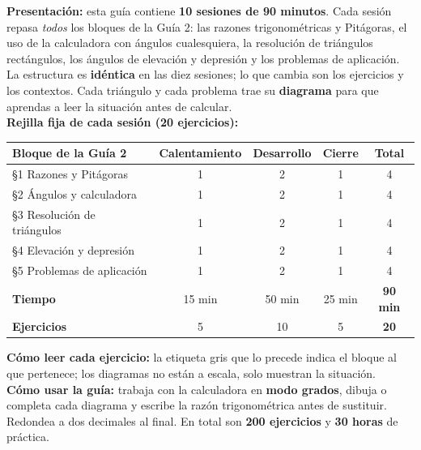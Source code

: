 \documentclass[12pt, letterpaper]{article}
\begin{document}


\vspace{4pt}
\begin{cuadroinfo}
  \small
  \textbf{Presentación:} esta guía contiene \textbf{10 sesiones de 90 minutos}. Cada sesión repasa \emph{todos} los bloques de la Guía 2: las razones trigonométricas y Pitágoras, el uso de la calculadora con ángulos cualesquiera, la resolución de triángulos rectángulos, los ángulos de elevación y depresión y los problemas de aplicación. La estructura es \textbf{idéntica} en las diez sesiones; lo que cambia son los ejercicios y los contextos. Cada triángulo y cada problema trae su \textbf{diagrama} para que aprendas a leer la situación antes de calcular.
  \\[4pt]
  \textbf{Rejilla fija de cada sesión (20 ejercicios):}
  \begin{center}
    \small
    \begin{tabular}{@{}l ccc c@{}}
      \toprule
      \textbf{Bloque de la Guía 2} & \textbf{Calentamiento} & \textbf{Desarrollo} & \textbf{Cierre} & \textbf{Total} \\
      \midrule
      §1 Razones y Pitágoras              & 1 & 2 & 1 & 4 \\
      §2 Ángulos y calculadora            & 1 & 2 & 1 & 4 \\
      §3 Resolución de triángulos         & 1 & 2 & 1 & 4 \\
      §4 Elevación y depresión            & 1 & 2 & 1 & 4 \\
      §5 Problemas de aplicación          & 1 & 2 & 1 & 4 \\
      \midrule
      \textbf{Tiempo}                     & 15 min & 50 min & 25 min & \textbf{90 min} \\
      \textbf{Ejercicios}                 & 5 & 10 & 5 & \textbf{20} \\
      \bottomrule
    \end{tabular}
  \end{center}
  \textbf{Cómo leer cada ejercicio:} la etiqueta gris que lo precede indica el bloque al que pertenece; los diagramas no están a escala, solo muestran la situación.
  \\[4pt]
  \textbf{Cómo usar la guía:} trabaja con la calculadora en \textbf{modo grados}, dibuja o completa cada diagrama y escribe la razón trigonométrica antes de sustituir. Redondea a dos decimales al final. En total son \textbf{200 ejercicios} y \textbf{30 horas} de práctica.
\end{cuadroinfo}
\end{document}
